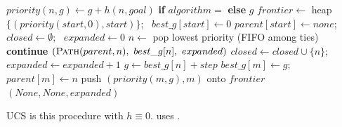 \begin{algorithm}[H]
\caption{Best-first graph search shared by UCS and \astar}
\begin{algorithmic}[1]
  \State $priority(n, g) \gets g + h(n, goal)$ \textbf{if} $algorithm = $ \astar{} \textbf{else} $g$ 
  \State $frontier \gets$ heap $\{(priority(start,0), start)\}$; \ $best\_g[start] \gets 0$
  \State $parent[start] \gets \textit{none}$; \ $closed \gets \emptyset$; \ $expanded \gets 0$
    \State $n \gets$ pop lowest priority (FIFO among ties)
     \textbf{continue} 
    \EndIf
      \State \Return $(\Call{Path}{parent, n},\ best\_g[n],\ expanded)$
    \EndIf
    \State $closed \gets closed \cup \{n\}$; \ $expanded \gets expanded + 1$
     
      \State $g \gets best\_g[n] + step$
        \State $best\_g[m] \gets g$; \ $parent[m] \gets n$
        \State push $(priority(m, g), m)$ onto $frontier$
      \EndIf
    \EndFor
  \EndWhile
  \State \Return $(\textit{None}, \textit{None}, expanded)$ 
\EndFunction
\end{algorithmic}
\end{algorithm}

UCS is this procedure with $h \equiv 0$. \astar{} uses .

